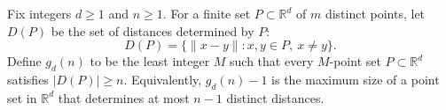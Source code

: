 Fix integers $d\ge 1$ and $n\ge 1$.
For a finite set $P\subset\mathbb{R}^d$ of $m$ distinct points, let $D(P)$ be the set of distances determined by $P$:
\[D(P)=\{\|x-y\|: x,y\in P,\ x\neq y\}.
\]
Define $g_d(n)$ to be the least integer $M$ such that every $M$-point set $P\subset\mathbb{R}^d$ satisfies $|D(P)|\ge n$.
Equivalently, $g_d(n)-1$ is the maximum size of a point set in $\mathbb{R}^d$ that determines at most $n-1$ distinct distances.
